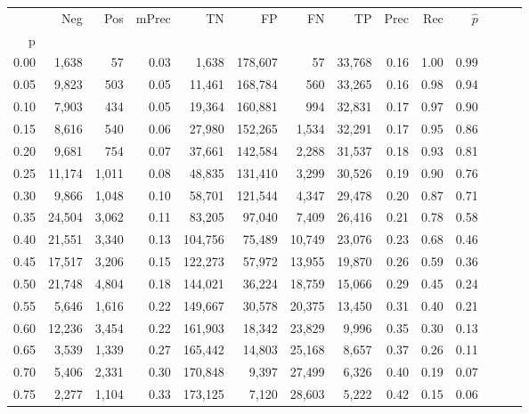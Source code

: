 \begin{tabular}{rrrrrrrrrrrrrr}
\toprule
{} &     Neg &    Pos & mPrec &       TN &       FP &      FN &      TP &  Prec &   Rec & $\hat{p}$ \\
p    &         &        &       &          &          &         &         &       &       &           \\
\midrule
0.00 &   1,638 &     57 &  0.03 &    1,638 &  178,607 &      57 &  33,768 &  0.16 &  1.00 &      0.99 \\
0.05 &   9,823 &    503 &  0.05 &   11,461 &  168,784 &     560 &  33,265 &  0.16 &  0.98 &      0.94 \\
0.10 &   7,903 &    434 &  0.05 &   19,364 &  160,881 &     994 &  32,831 &  0.17 &  0.97 &      0.90 \\
0.15 &   8,616 &    540 &  0.06 &   27,980 &  152,265 &   1,534 &  32,291 &  0.17 &  0.95 &      0.86 \\
0.20 &   9,681 &    754 &  0.07 &   37,661 &  142,584 &   2,288 &  31,537 &  0.18 &  0.93 &      0.81 \\
0.25 &  11,174 &  1,011 &  0.08 &   48,835 &  131,410 &   3,299 &  30,526 &  0.19 &  0.90 &      0.76 \\
0.30 &   9,866 &  1,048 &  0.10 &   58,701 &  121,544 &   4,347 &  29,478 &  0.20 &  0.87 &      0.71 \\
0.35 &  24,504 &  3,062 &  0.11 &   83,205 &   97,040 &   7,409 &  26,416 &  0.21 &  0.78 &      0.58 \\
0.40 &  21,551 &  3,340 &  0.13 &  104,756 &   75,489 &  10,749 &  23,076 &  0.23 &  0.68 &      0.46 \\
0.45 &  17,517 &  3,206 &  0.15 &  122,273 &   57,972 &  13,955 &  19,870 &  0.26 &  0.59 &      0.36 \\
0.50 &  21,748 &  4,804 &  0.18 &  144,021 &   36,224 &  18,759 &  15,066 &  0.29 &  0.45 &      0.24 \\
0.55 &   5,646 &  1,616 &  0.22 &  149,667 &   30,578 &  20,375 &  13,450 &  0.31 &  0.40 &      0.21 \\
0.60 &  12,236 &  3,454 &  0.22 &  161,903 &   18,342 &  23,829 &   9,996 &  0.35 &  0.30 &      0.13 \\
0.65 &   3,539 &  1,339 &  0.27 &  165,442 &   14,803 &  25,168 &   8,657 &  0.37 &  0.26 &      0.11 \\
0.70 &   5,406 &  2,331 &  0.30 &  170,848 &    9,397 &  27,499 &   6,326 &  0.40 &  0.19 &      0.07 \\
0.75 &   2,277 &  1,104 &  0.33 &  173,125 &    7,120 &  28,603 &   5,222 &  0.42 &  0.15 &      0.06 \\

\end{tabular}
